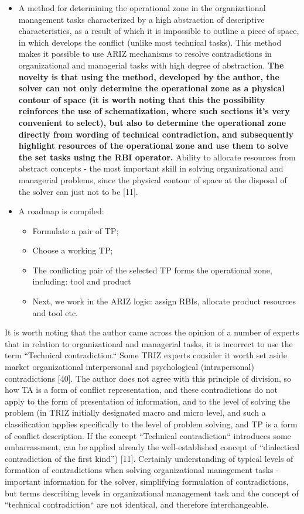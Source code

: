 \documentclass[11pt,a4paper]{book}
\begin{document}
\begin{itemize}
\item A method for determining the operational zone in the organizational
  management tasks characterized by a high abstraction of descriptive
  characteristics, as a result of which it is impossible to outline a piece of
  space, in which develops the conflict (unlike most technical tasks).  This
  method makes it possible to use ARIZ mechanisms to resolve contradictions in
  organizational and managerial tasks with high degree of
  abstraction. \textbf{The novelty is that using the method, developed by the
    author, the solver can not only determine the operational zone as a
    physical contour of space (it is worth noting that this the possibility
    reinforces the use of schematization, where such sections it’s very
    convenient to select), but also to determine the operational zone directly
    from wording of technical contradiction, and subsequently highlight
    resources of the operational zone and use them to solve the set tasks
    using the RBI operator.} Ability to allocate resources from abstract
  concepts - the most important skill in solving organizational and managerial
  problems, since the physical contour of space at the disposal of the solver
  can just not to be [11].
\item A roadmap is compiled:
  \begin{itemize}
  \item Formulate a pair of TP;
  \item Choose a working TP;
  \item The conflicting pair of the selected TP forms the operational zone,
    including: tool and product
  \item Next, we work in the ARIZ logic: assign RBIs, allocate product
    resources and tool etc.
  \end{itemize}
\end{itemize}
It is worth noting that the author came across the opinion of a number of
experts that in relation to organizational and managerial tasks, it is
incorrect to use the term “Technical contradiction.“ Some TRIZ experts
consider it worth set aside market organizational interpersonal and
psychological (intrapersonal) contradictions [40]. The author does not agree
with this principle of division, so how TA is a form of conflict
representation, and these contradictions do not apply to the form of
presentation of information, and to the level of solving the problem (in TRIZ
initially designated macro and micro level, and such a classification applies
specifically to the level of problem solving, and TP is a form of conflict
description. If the concept “Technical contradiction“ introduces some
embarrassment, can be applied already the well-established concept of
“dialectical contradiction of the first kind”) [11]. Certainly understanding
of typical levels of formation of contradictions when solving organizational
management tasks - important information for the solver, simplifying
formulation of contradictions, but terms describing levels in organizational
management task and the concept of “technical contradiction“ are not
identical, and therefore interchangeable.
\end{document}
